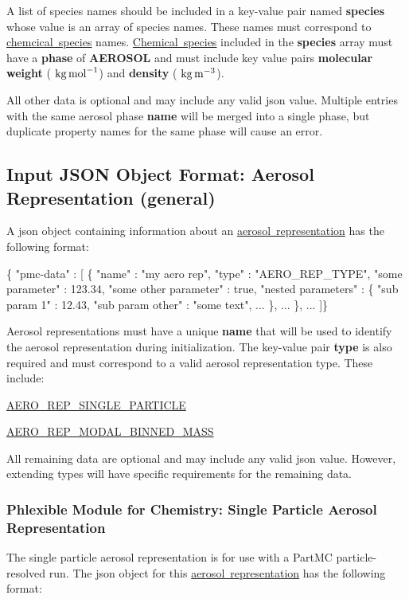 A list of species names should be included in a key-\/value pair named {\bfseries species} whose value is an array of species names. These names must correspond to \mbox{\hyperlink{input_format_species}{chemcical species}} names. \mbox{\hyperlink{input_format_species}{Chemical species}} included in the {\bfseries species} array must have a {\bfseries phase} of {\bfseries A\+E\+R\+O\+S\+OL} and must include key value pairs {\bfseries molecular} {\bfseries weight} ( $\mbox{\si{\kilogram\per\mole}}$) and {\bfseries density} ( $\mbox{\si{\kilogram\per\cubic\metre}}$).

All other data is optional and may include any valid {\ttfamily json} value. Multiple entries with the same aerosol phase {\bfseries name} will be merged into a single phase, but duplicate property names for the same phase will cause an error. \hypertarget{input_format_aero_rep}{}\subsection{Input J\+S\+ON Object Format\+: Aerosol Representation (general)}\label{input_format_aero_rep}
A {\ttfamily json} object containing information about an \mbox{\hyperlink{phlex_aero_rep}{aerosol representation}} has the following format\+:


\begin{DoxyCode}
\{ "pmc-data" : [
  \{
    "name" : "my aero rep",
    "type" : "AERO\_REP\_TYPE",
    "some parameter" : 123.34,
    "some other parameter" : true,
    "nested parameters" : \{
      "sub param 1" : 12.43,
      "sub param other" : "some text",
      ...
    \},
    ...
  \},
  ...
]\}
\end{DoxyCode}
 Aerosol representations must have a unique {\bfseries name} that will be used to identify the aerosol representation during initialization. The key-\/value pair {\bfseries type} is also required and must correspond to a valid aerosol representation type. These include\+:


\begin{DoxyItemize}
\item \mbox{\hyperlink{phlex_aero_rep_single_particle}{A\+E\+R\+O\+\_\+\+R\+E\+P\+\_\+\+S\+I\+N\+G\+L\+E\+\_\+\+P\+A\+R\+T\+I\+C\+LE}}
\item \mbox{\hyperlink{phlex_aero_rep_modal_binned_mass}{A\+E\+R\+O\+\_\+\+R\+E\+P\+\_\+\+M\+O\+D\+A\+L\+\_\+\+B\+I\+N\+N\+E\+D\+\_\+\+M\+A\+SS}}
\end{DoxyItemize}

All remaining data are optional and may include any valid {\ttfamily json} value. However, extending types will have specific requirements for the remaining data. \hypertarget{phlex_aero_rep_single_particle}{}\subsubsection{Phlexible Module for Chemistry\+: Single Particle Aerosol Representation}\label{phlex_aero_rep_single_particle}
The single particle aerosol representation is for use with a Part\+MC particle-\/resolved run. The {\ttfamily json} object for this \mbox{\hyperlink{phlex_aero_rep}{aerosol representation}} has the following format\+:


